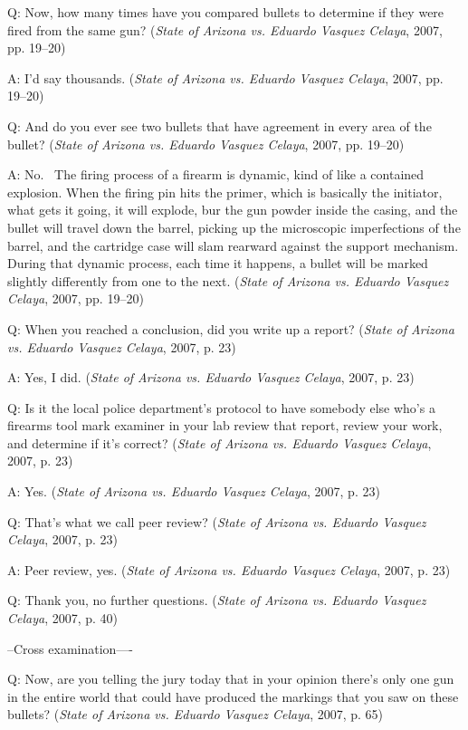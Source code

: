 \documentclass[print]{nuthesis}
\begin{document}
Q: Now, how many times have you compared bullets to determine if they were fired from the same gun? (\emph{State of {Arizona} vs. Eduardo {Vasquez} {Celaya}}, 2007, pp. 19--20)

A: I'd say thousands. (\emph{State of {Arizona} vs. Eduardo {Vasquez} {Celaya}}, 2007, pp. 19--20)

Q: And do you ever see two bullets that have agreement in every area of the bullet? (\emph{State of {Arizona} vs. Eduardo {Vasquez} {Celaya}}, 2007, pp. 19--20)

A: No.~
The firing process of a firearm is dynamic, kind of like a contained explosion.
When the firing pin hits the primer, which is basically the initiator, what gets it going, it will explode, bur the gun powder inside the casing, and the bullet will travel down the barrel, picking up the microscopic imperfections of the barrel, and the cartridge case will slam rearward against the support mechanism.
During that dynamic process, each time it happens, a bullet will be marked slightly differently from one to the next. (\emph{State of {Arizona} vs. Eduardo {Vasquez} {Celaya}}, 2007, pp. 19--20)

Q: When you reached a conclusion, did you write up a report? (\emph{State of {Arizona} vs. Eduardo {Vasquez} {Celaya}}, 2007, p. 23)

A: Yes, I did. (\emph{State of {Arizona} vs. Eduardo {Vasquez} {Celaya}}, 2007, p. 23)

Q: Is it the local police department's protocol to have somebody else who's a firearms tool mark examiner in your lab review that report, review your work, and determine if it's correct? (\emph{State of {Arizona} vs. Eduardo {Vasquez} {Celaya}}, 2007, p. 23)

A: Yes. (\emph{State of {Arizona} vs. Eduardo {Vasquez} {Celaya}}, 2007, p. 23)

Q: That's what we call peer review? (\emph{State of {Arizona} vs. Eduardo {Vasquez} {Celaya}}, 2007, p. 23)

A: Peer review, yes. (\emph{State of {Arizona} vs. Eduardo {Vasquez} {Celaya}}, 2007, p. 23)

Q: Thank you, no further questions. (\emph{State of {Arizona} vs. Eduardo {Vasquez} {Celaya}}, 2007, p. 40)

--Cross examination----

Q: Now, are you telling the jury today that in your opinion there's only one gun in the entire world that could have produced the markings that you saw on these bullets? (\emph{State of {Arizona} vs. Eduardo {Vasquez} {Celaya}}, 2007, p. 65)
\end{document}
